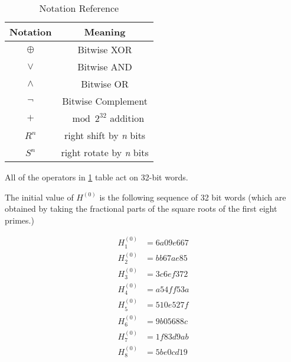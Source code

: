 \documentclass{report}
\begin{document}
\begin{center}
	\begin{table}[h!]
		\centering
		\begin{tabular}{|| c | c ||}
			\hline 
			\textbf{Notation} & \textbf{Meaning} \\ 
			\hline 
			$\oplus$ & Bitwise XOR \\
			\hline 
			$\vee$ & Bitwise AND \\ 
			\hline 
			$\wedge$ & Bitwise OR \\
			\hline 
			$\neg$ & Bitwise Complement\\ 
			\hline 
			$+$ & $\mod 2^{32}$ addition \\
			\hline 
			$R^{n}$ & right shift by \textit{n} bits\\
			\hline 
			$S^{n}$ & right rotate by \textit{n} bits\\
			\hline
		\end{tabular}
		\caption{Notation Reference}
		\label{notation-reference}
	\end{table}
\end{center}

All of the operators in \ref{notation-reference} table act on 32-bit words.

The initial value of $H^{(0)}$ is the following sequence of 32 bit words (which are obtained by taking the fractional parts of the square roots of the first eight primes.)

\begin{align}
	H_{1}^{(0)} &= 6a09e667 \\
	H_{2}^{(0)} &= bb67ae85 \\
	H_{3}^{(0)} &= 3c6ef372 \\
	H_{4}^{(0)} &= a54ff53a \\
	H_{5}^{(0)} &= 510e527f \\
	H_{6}^{(0)} &= 9b05688c \\
	H_{7}^{(0)} &= 1f83d9ab \\
	H_{8}^{(0)} &= 5be0cd19
\end{align}
\end{document}
